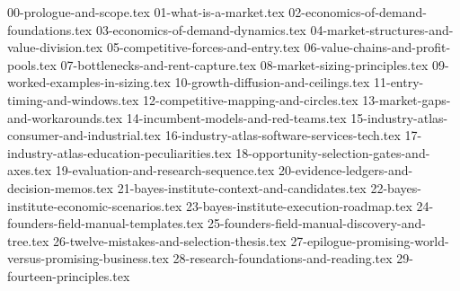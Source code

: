 
{00-prologue-and-scope.tex}
{01-what-is-a-market.tex}
{02-economics-of-demand-foundations.tex}
{03-economics-of-demand-dynamics.tex}
{04-market-structures-and-value-division.tex}
{05-competitive-forces-and-entry.tex}
{06-value-chains-and-profit-pools.tex}
{07-bottlenecks-and-rent-capture.tex}
{08-market-sizing-principles.tex}
{09-worked-examples-in-sizing.tex}
{10-growth-diffusion-and-ceilings.tex}
{11-entry-timing-and-windows.tex}
{12-competitive-mapping-and-circles.tex}
{13-market-gaps-and-workarounds.tex}
{14-incumbent-models-and-red-teams.tex}
{15-industry-atlas-consumer-and-industrial.tex}
{16-industry-atlas-software-services-tech.tex}
{17-industry-atlas-education-peculiarities.tex}
{18-opportunity-selection-gates-and-axes.tex}
{19-evaluation-and-research-sequence.tex}
{20-evidence-ledgers-and-decision-memos.tex}
{21-bayes-institute-context-and-candidates.tex}
{22-bayes-institute-economic-scenarios.tex}
{23-bayes-institute-execution-roadmap.tex}
{24-founders-field-manual-templates.tex}
{25-founders-field-manual-discovery-and-tree.tex}
{26-twelve-mistakes-and-selection-thesis.tex}
{27-epilogue-promising-world-versus-promising-business.tex}
{28-research-foundations-and-reading.tex}
{29-fourteen-principles.tex}
